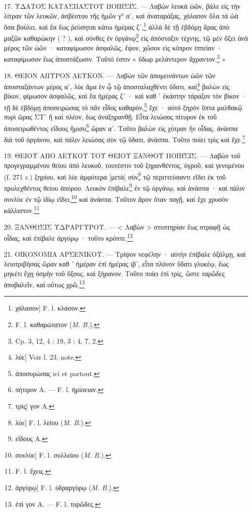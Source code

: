 \documentclass[a4paper, 11pt, oneside, polutonikogreek, french]{article}
\begin{document}
17. ΥΔΑΤΟΣ ΚΑΤΑΣΠΑΣΤΟΥ ΠΟΙΗΣΙΣ. --- Λαβὼν λευκὰ ὠῶν, βάλε εἰς τὴν λίτραν τῶν λευκῶν, ἀσβέστου τῆς ἡμῶν γ° αʹ, καὶ ἀναταράξας, χάλασον ὅλα τὰ ὠὰ ὅσα βούλει, καὶ ἔα ἕως ῥεύσηται κάτω ἡμέρας ζʹ,\footnote{χάλασον] F. l. κλάσον.} ἀλλὰ δὲ τῇ ἑβδόμῃ ἄρας ἀπὸ μαζῶν καθαρώκην ( ? ), καὶ σύνθες ἐν ὀργάνῳ\footnote{F. l. καθαρώτατον (\emph{M. B.}).} εἰς ἀπόσταξιν τέχνης, τῷ μὲν ὄξει ἀνὰ μέρος τῶν ὠῶν · καταφίμωσον ἀσφαλῶς, ἕψον, χῶσον εἰς κόπρον ἱππείαν · καταφίμωσον ἕως ἀποστάξωσιν. Τοῦτό ἐστιν « ὕδωρ μελάντερον ἄχραντον.\footnote{Cp. 3, 12, 4 ; 19, 3 ; 4, 7, 2.} »

18. ΘΕΙΟΝ ΑΠΥΡΟΝ ΛΕΥΚΟΝ. --- Λαβὼν τῶν ἀπομεινάντων ὠῶν τῶν ἀποσταξάντων μέρος αʹ, λύε ἅμα ἐν ᾧ τῷ ἀποσταλαχθέντι ὕδατι, καὶ\footnote{λύε] Voir l. 23, note.} βαλὼν εἰς βίκον, φίμωσον ἀσφαλῶς, καὶ ἔα ἡμέρας ζʹ · καὶ καθ ᾽ ἑκάστην τάραξον τὸν βίκον · τῇ δὲ ἑβδόμῃ ἀποσειρώσας τὸ πᾶν εἶδος καθαρὸν,\footnote{ἀποσυρώσας ici et partout.} ἔχε · αὐτὸ ξηρὸν ὄπτα μαλθακῷ πυρὶ ὥρας ΣΤʹ ἢ καὶ πλέον, ἕως ἀναξηρανθῇ. Εἶτα λειώσας πίτυρον ἐκ τοῦ ἀποσειρωθέντος εἴδους ἥμισυ\footnote{πήτιρον A. --- F. l. ἡμίσειαν.} ὥραν αʹ. Τοῦτο βαλὼν εἰς χύτραν ἣν οἶδας, ἀνάσπα διὰ τοῦ ὀργάνου, καὶ πάλιν λειώσας σὺν τῷ ὕδατι, ἀνάσπα. Τοῦτο ποίει τρὶς καὶ ἔχε.\footnote{τρὶς] γον A.}

19. ΘΕΙΟΥ ΑΠΟ ΛΕΥΚΟΥ ΤΟΥ ΘΕΙΟΥ ΞΑΝΘΟΥ ΠΟΙΗΣΙΣ. --- Λαβὼν τοῦ προγεγραμμένου θείου ἀπὸ λευκοῦ, τουτέστιν τοῦ ξηρανθέντος, ὑγροῦ, καὶ γενομένου (f. 271 r.) ξηρίου, καὶ λύε ἀμφότερα [μετὰ] σὺν\footnote{λύε] F. l. λείου (\emph{M. B.}).} τῷ περιττεύσαντι εἴδει ἐκ τοῦ προλεχθέντος θείου ἀπύρου. Λευκὸν ἐπίβαλε\footnote{εἴδους A.} ἐν τῷ ὀργάνῳ, καὶ ἀνάσπα · καὶ πάλιν συνλύε ἐν τῷ ἰδίῳ εἴδει,\footnote{συνλύε] F. l. συλλείου (\emph{M. B.}).} καὶ ἀνάσπα. Τοῦτον ἄρον ὅταν παγῇ, καὶ ἔχε χρυσὸν κάλλιστον.\footnote{F. l. ἔχεις.}

20. ΞΑΝΘΩΣΙΣ ΥΔΡΑΡΓΥΡΟΥ. --- < Λαβὼν > στυπτηρίαν ἕως στραφῇ ὡς οἶδας, καὶ ἐπίβαλε ἀργύρῳ · τοῦτο κρύπτε.\footnote{ἀργύρῳ] F. l. ὑδραργύρῳ (\emph{M. B.}).}

21. ΟΙΚΟΝΟΜΙΑ ΑΡΣΕΝΙΚΟΥ. --- Τρίψον νεφέλην · αὐτὴν ἐπίβαλε ὀξάλμῃ, καὶ λειοτριβήσας ὥραν καθ ᾽ ἡμέραν ἐπὶ ἡμέρας ιβʹ, εἶτα πλύνον ὕδατι γλυκέῳ, ἕως μηκέτι ἔχῃ ὀσμὴν τοῦ ὄξους, καὶ ξήρανον. Τοῦτο ποίει ἐπὶ τρὶς, ὥστε ταρῶδες ἀποβαλεῖν, καὶ οὕτως χρῶ.\footnote{ἐπὶ γον A. --- F. l. τυρῶδες.}
\end{document}
